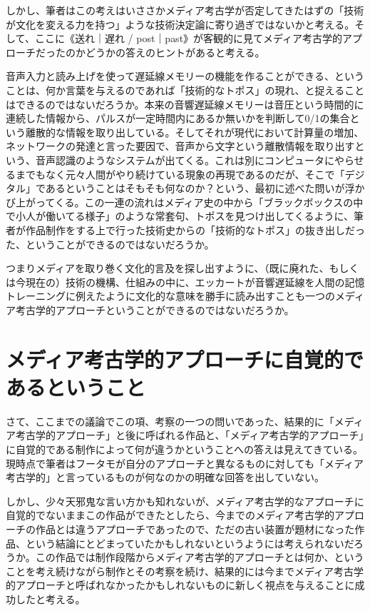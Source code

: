 \documentclass[a4paper,report]{jsbook}
\begin{document}
しかし、筆者はこの考えはいささかメディア考古学が否定してきたはずの「技術が文化を変える力を持つ」ような技術決定論に寄り過ぎではないかと考える。そして、ここに《送れ｜遅れ
/
post｜past》が客観的に見てメディア考古学的アプローチだったのかどうかの答えのヒントがあると考える。

音声入力と読み上げを使って遅延線メモリーの機能を作ることができる、ということは、何か言葉を与えるのであれば「技術的なトポス」の現れ、と捉えることはできるのではないだろうか。本来の音響遅延線メモリーは音圧という時間的に連続した情報から、パルスが一定時間内にあるか無いかを判断して0/1の集合という離散的な情報を取り出している。そしてそれが現代において計算量の増加、ネットワークの発達と言った要因で、音声から文字という離散情報を取り出すという、音声認識のようなシステムが出てくる。これは別にコンピュータにやらせるまでもなく元々人間がやり続けている現象の再現であるのだが、そこで「デジタル」であるということはそもそも何なのか？という、最初に述べた問いが浮かび上がってくる。この一連の流れはメディア史の中から「ブラックボックスの中で小人が働いてる様子」のような常套句、トポスを見つけ出してくるように、筆者が作品制作をする上で行った技術史からの「技術的なトポス」の抜き出しだった、ということができるのではないだろうか。

つまりメディアを取り巻く文化的言及を探し出すように、（既に廃れた、もしくは今現在の）技術の機構、仕組みの中に、エッカートが音響遅延線を人間の記憶トレーニングに例えたように文化的な意味を勝手に読み出すことも一つのメディア考古学的アプローチということができるのではないだろうか。

\section{メディア考古学的アプローチに自覚的であるということ}\label{ux30e1ux30c7ux30a3ux30a2ux8003ux53e4ux5b66ux7684ux30a2ux30d7ux30edux30fcux30c1ux306bux81eaux899aux7684ux3067ux3042ux308bux3068ux3044ux3046ux3053ux3068}

さて、ここまでの議論でこの項、考察の一つの問いであった、結果的に「メディア考古学的アプローチ」と後に呼ばれる作品と、「メディア考古学的アプローチ」に自覚的である制作によって何が違うかということへの答えは見えてきている。現時点で筆者はフータモが自分のアプローチと異なるものに対しても「メディア考古学的」と言っているものが何なのかの明確な回答を出していない。

しかし、少々天邪鬼な言い方かも知れないが、メディア考古学的なアプローチに自覚的でないままこの作品ができたとしたら、今までのメディア考古学的アプローチの作品とは違うアプローチであったので、ただの古い装置が題材になった作品、という結論にとどまっていたかもしれないというようには考えられないだろうか。この作品では制作段階からメディア考古学的アプローチとは何か、ということを考え続けながら制作とその考察を続け、結果的には今までメディア考古学的アプローチと呼ばれなかったかもしれないものに新しく視点を与えることに成功したと考える。
\end{document}

